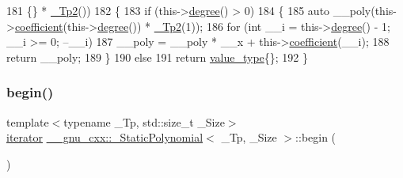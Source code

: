 \begin{DoxyCode}
181                               \{\} * \hyperlink{class____gnu__cxx_1_1__StaticPolynomial_a688f26b7c706701416fad299240aa856}{\_Tp2}())
182         \{
183           \textcolor{keywordflow}{if} (this->\hyperlink{class____gnu__cxx_1_1__StaticPolynomial_a5977dac3a84e8a43f3e9da28b62ca46a}{degree}() > 0)
184             \{
185               \textcolor{keyword}{auto} \_\_poly(this->\hyperlink{class____gnu__cxx_1_1__StaticPolynomial_a74535a3f8f586223097b30891bc1402b}{coefficient}(this->\hyperlink{class____gnu__cxx_1_1__StaticPolynomial_a5977dac3a84e8a43f3e9da28b62ca46a}{degree}()) * 
      \hyperlink{class____gnu__cxx_1_1__StaticPolynomial_a688f26b7c706701416fad299240aa856}{\_Tp2}(1));
186               \textcolor{keywordflow}{for} (\textcolor{keywordtype}{int} \_\_i = this->\hyperlink{class____gnu__cxx_1_1__StaticPolynomial_a5977dac3a84e8a43f3e9da28b62ca46a}{degree}() - 1; \_\_i >= 0; --\_\_i)
187                 \_\_poly = \_\_poly * \_\_x + this->\hyperlink{class____gnu__cxx_1_1__StaticPolynomial_a74535a3f8f586223097b30891bc1402b}{coefficient}(\_\_i);
188               \textcolor{keywordflow}{return} \_\_poly;
189             \}
190           \textcolor{keywordflow}{else}
191             \textcolor{keywordflow}{return} \hyperlink{class____gnu__cxx_1_1__StaticPolynomial_aad5f3d6d5876b6926b30724aeac649d6}{value\_type}\{\};
192         \}
\end{DoxyCode}
\mbox{\label{class____gnu__cxx_1_1__StaticPolynomial_a5ecf3a3e578ed364160dec4d980ad877}} 
\subsubsection{\texorpdfstring{begin()}{begin()}\hspace{0.1cm}{\footnotesize\ttfamily [1/2]}}
{\footnotesize\ttfamily template$<$typename \+\_\+\+Tp, std\+::size\+\_\+t \+\_\+\+Size$>$ \\
\hyperlink{class____gnu__cxx_1_1__StaticPolynomial_af042e6cdb307879fbfe357c13a843c7c}{iterator} \hyperlink{class____gnu__cxx_1_1__StaticPolynomial}{\+\_\+\+\_\+gnu\+\_\+cxx\+::\+\_\+\+Static\+Polynomial}$<$ \+\_\+\+Tp, \+\_\+\+Size $>$\+::begin (\begin{DoxyParamCaption}{ }\end{DoxyParamCaption})\hspace{0.3cm}{\ttfamily [inline]}}



